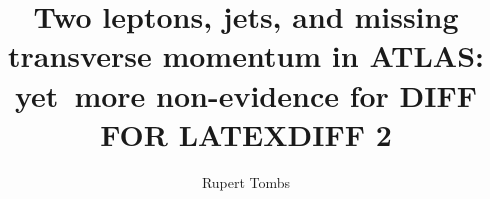 \documentclass[nobind, draft, oneside]{minithesis} %
\title{
Two leptons, jets, and missing transverse momentum in ATLAS:
yet~more non-evidence for DIFF FOR LATEXDIFF 2
}
\author{Rupert Tombs}
\begin{document}
\begin{frontmatter}

\end{frontmatter}

\begin{mainmatter}




\end{mainmatter}

% 

\begin{backmatter}

\end{backmatter}
\end{document}
